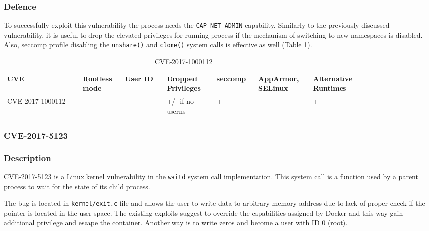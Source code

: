 \subsubsection*{Defence}

To successfully exploit this vulnerability the process needs the \texttt{CAP\_NET\_ADMIN} capability. Similarly to the previously discussed vulnerability, it is useful to drop the elevated privileges for running process if the mechanism of switching to new namespaces is disabled. Also, seccomp profile disabling the \texttt{unshare()} and \texttt{clone()} system calls is effective as well (Table \ref{tab:h:7}).

\begin{table}[H]
    \centering \small
    \begin{tabular}{| p{0.18\linewidth} | p{0.1\linewidth} | p{0.1\linewidth} | p{0.12\linewidth} | p{0.1\linewidth} | p{0.12\linewidth} | p{0.12\linewidth} |} \hline
    CVE & Rootless mode & User ID & Dropped Privileges & seccomp & AppArmor, SELinux & Alternative Runtimes \\ \hline
    CVE-2017-1000112 & - & - & \cellcolor{yellow!25} +/- \linebreak if no userns & \cellcolor{green!25} + &  & \cellcolor{green!25} + \\ \hline
    \end{tabular}
    \caption{CVE-2017-1000112}
    \label{tab:h:7}
\end{table}


\subsubsection{CVE-2017-5123}
\subsubsection*{Description}

CVE-2017-5123 is a Linux kernel vulnerability in the \texttt{waitd} system call implementation. This system call is a function used by a parent process to wait for the state of its child process.

The bug is located in \texttt{kernel/exit.c} file and allows the user to write data to arbitrary memory address due to lack of proper check if the pointer is located in the user space. The existing exploits suggest to override the capabilities assigned by Docker and this way gain additional privilege and escape the container. Another way is to write zeros and become a user with ID 0 (root). 

